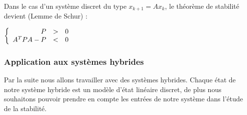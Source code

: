 \begin{theo}
	Dans le cas d'un système discret du type $x_{k+1} = Ax_k$, le théorème de stabilité devient (Lemme de Schur) :
	\begin{center}
		$   \left \{
		\begin{array}{r c l}
		P & > & 0 \\
		A^TPA - P & < & 0
		\end{array}
		\right. $
	\end{center}
	\label{theo:lyapDiscret}
\end{theo}
%

\pagebreak
\subsubsection{Application aux systèmes hybrides}
\label{subsubsec:applicationStabHybride}
Par la suite nous allons travailler avec des systèmes hybrides. Chaque état de notre système hybride est un modèle d'état linéaire discret, de plus nous souhaitons pouvoir prendre en compte les entrées de notre système dans l'étude de la stabilité.

